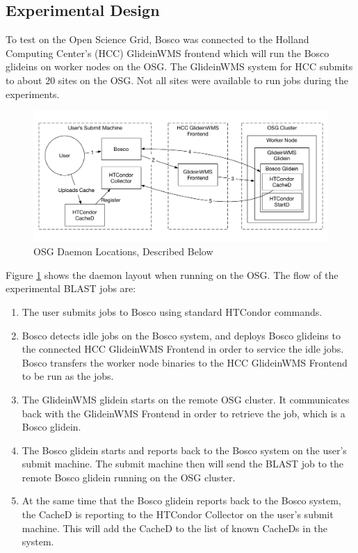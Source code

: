\subsection{Experimental Design}
To test on the Open Science Grid, Bosco was connected to the Holland Computing Center's (HCC) GlideinWMS frontend which will run the Bosco glideins on worker nodes on the OSG.  The GlideinWMS system for HCC submits to about 20 sites on the OSG.  Not all sites were available to run jobs during the experiments.

\begin{figure}[ht]
	\centering
	\includegraphics[width=\textwidth]{images/OSGDaemonLayout.pdf}
	\caption{OSG Daemon Locations, Described Below}
	\label{fig:osgdaemonlayoutcached}
\end{figure}

Figure \ref{fig:osgdaemonlayoutcached} shows the daemon layout when running on the OSG.  The flow of the experimental BLAST jobs are:

\begin{enumerate}
	\item The user submits jobs to Bosco using standard HTCondor commands.
	
	\item Bosco detects idle jobs on the Bosco system, and deploys Bosco glideins to the connected HCC GlideinWMS Frontend in order to service the idle jobs.  Bosco transfers the worker node binaries to the HCC GlideinWMS Frontend to be run as the jobs.
	
	\item The GlideinWMS glidein starts on the remote OSG cluster.  It communicates back with the GlideinWMS Frontend in order to retrieve the job, which is a Bosco glidein.
	
	\item The Bosco glidein starts and reports back to the Bosco system on the user's submit machine.  The submit machine then will send the BLAST job to the remote Bosco glidein running on the OSG cluster.
	
	\item At the same time that the Bosco glidein reports back to the Bosco system, the CacheD is reporting to the HTCondor Collector on the user's submit machine.  This will add the CacheD to the list of known CacheDs in the system.
\end{enumerate}

